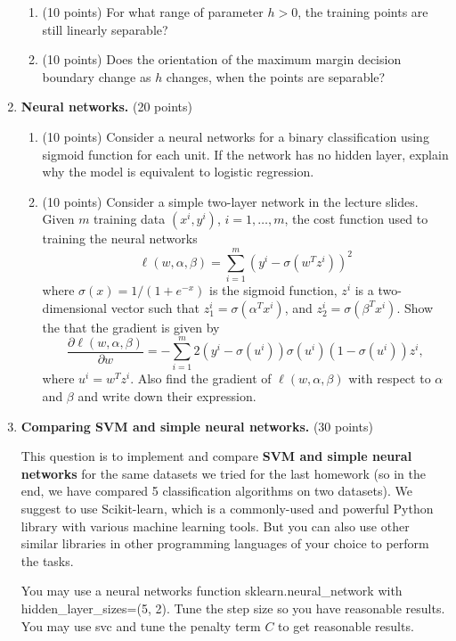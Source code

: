 \documentclass[twoside,10pt]{article}
\begin{document}
\begin{enumerate}
\begin{enumerate}
\item (10 points) For what range of parameter $h > 0$, the training points are still linearly separable?



\item (10 points) Does the orientation of the maximum margin decision boundary change as $h$ changes, when the points are separable?
\end{enumerate}



\item {\bf Neural networks.} (20 points)

\begin{enumerate}
\item (10 points)
Consider a neural networks for a binary classification using sigmoid function for each unit. If the network has no hidden layer, explain why the model is equivalent to logistic regression. 
\item (10 points) 
Consider a simple two-layer network in the lecture slides. Given $m$ training data $(x^i, y^i)$, $i = 1, \ldots, m$, the cost function used to training the neural networks
\[
\ell(w, \alpha, \beta) = \sum_{i=1}^m (y^i - \sigma(w^T z^i))^2
\]
where $\sigma (x) = 1/(1+e^{-x})$ is the sigmoid function, $z^i$ is a two-dimensional vector such that  $z_1^i = \sigma(\alpha^T x^i)$, and $z_2^i = \sigma(\beta^T x^i)$. Show the that the gradient is given by
\[
\frac{\partial \ell(w, \alpha, \beta) }{\partial w}
= - \sum_{i=1}^m 2(y^i - \sigma(u^i))\sigma(u^i)(1-\sigma(u^i)) z^i,
\]
where $u^i = w^T z^i$. Also find the gradient of $\ell(w, \alpha, \beta)$ with respect to $\alpha$ and $\beta$ and write down their expression.
\end{enumerate}


\item {\bf Comparing SVM and simple neural networks.} (30 points)

This question is to implement and compare {\bf SVM and simple neural networks} for the same datasets we tried for the last homework (so in the end, we have compared 5 classification algorithms on two datasets). We suggest to use \textsf{Scikit-learn}, which is a commonly-used and powerful \textsf{Python} library with various machine learning tools. But you can also use other similar libraries in other programming languages of your choice to perform the tasks. 

You may use a neural networks function \textsf{sklearn.neural\_network} with \textsf{hidden\_layer\_sizes=(5, 2)}. Tune the step size so you have reasonable results. You may use \textsf{svc} and tune the penalty term $C$ to get reasonable results. 


\end{enumerate}
\end{document}
